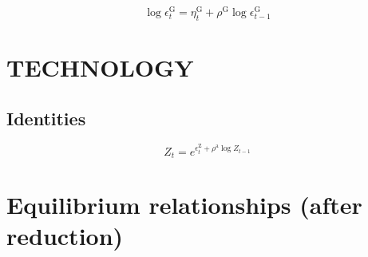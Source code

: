 \begin{equation}
\log{\epsilon^{\mathrm{G}}_{t}} = \eta^{\mathrm{G}}_{t} + {\rho^{\mathrm{G}}} {\log{\epsilon^{\mathrm{G}}_{t-1}}}
\end{equation}




\section{TECHNOLOGY}

\subsection{Identities}

\begin{equation}
Z_{t} = e^{\epsilon^{\mathrm{Z}}_{t} + {\rho^{\mathrm{a}}} {\log{Z_{t-1}}}}
\end{equation}




\section{Equilibrium relationships (after reduction)}

